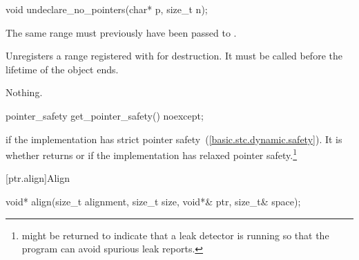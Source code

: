 %
\begin{itemdecl}
void undeclare_no_pointers(char* p, size_t n);
\end{itemdecl}

\begin{itemdescr}
\pnum
\requires The same range must previously have been passed to
.

\pnum
\effects Unregisters a range registered with  for
destruction. It must be called before the lifetime of the object ends.

\pnum
\throws Nothing.
\end{itemdescr}

%
\begin{itemdecl}
pointer_safety get_pointer_safety() noexcept;
\end{itemdecl}

\begin{itemdescr}
\pnum
\returns {} if the implementation has strict pointer
safety~(\ref{basic.stc.dynamic.safety}). It is
whether
 returns  or
 if the implementation has relaxed pointer
safety.\footnote{ might be returned to indicate
that a leak detector is running so that the program can avoid spurious leak
reports.}
\end{itemdescr}


[ptr.align]{Align}

%
\begin{itemdecl}
void* align(size_t alignment, size_t size, void*& ptr, size_t& space);
\end{itemdecl}

